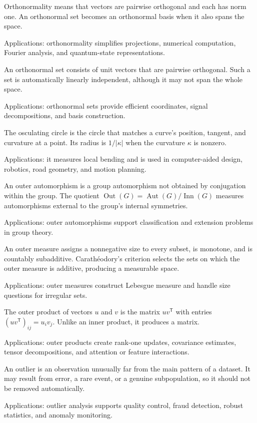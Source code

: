 Orthonormality means that vectors are pairwise orthogonal and each has norm one. An orthonormal set becomes an orthonormal basis when it also spans the space. \par\noindent Applications: orthonormality simplifies projections, numerical computation, Fourier analysis, and quantum-state representations.

An orthonormal set consists of unit vectors that are pairwise orthogonal. Such a set is automatically linearly independent, although it may not span the whole space. \par\noindent Applications: orthonormal sets provide efficient coordinates, signal decompositions, and basis construction.

The osculating circle is the circle that matches a curve's position, tangent, and curvature at a point. Its radius is $1/|\kappa|$ when the curvature $\kappa$ is nonzero. \par\noindent Applications: it measures local bending and is used in computer-aided design, robotics, road geometry, and motion planning.

An outer automorphism is a group automorphism not obtained by conjugation within the group. The quotient $\operatorname{Out}(G)=\operatorname{Aut}(G)/\operatorname{Inn}(G)$ measures automorphisms external to the group's internal symmetries. \par\noindent Applications: outer automorphisms support classification and extension problems in group theory.

An outer measure assigns a nonnegative size to every subset, is monotone, and is countably subadditive. Carathéodory's criterion selects the sets on which the outer measure is additive, producing a measurable space. \par\noindent Applications: outer measures construct Lebesgue measure and handle size questions for irregular sets.

The outer product of vectors $u$ and $v$ is the matrix $uv^{\mathsf T}$ with entries $(uv^{\mathsf T})_{ij}=u_iv_j$. Unlike an inner product, it produces a matrix. \par\noindent Applications: outer products create rank-one updates, covariance estimates, tensor decompositions, and attention or feature interactions.

An outlier is an observation unusually far from the main pattern of a dataset. It may result from error, a rare event, or a genuine subpopulation, so it should not be removed automatically. \par\noindent Applications: outlier analysis supports quality control, fraud detection, robust statistics, and anomaly monitoring.

